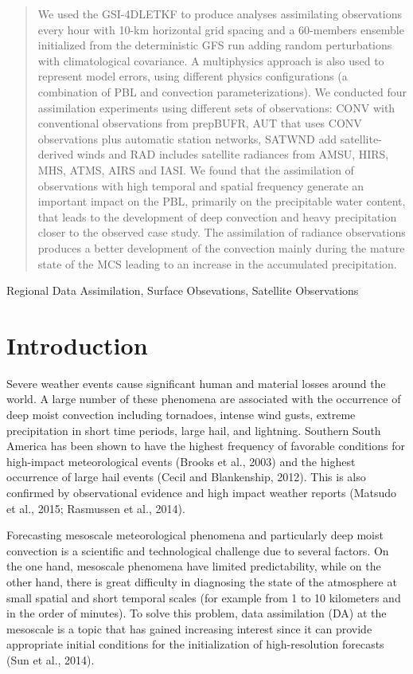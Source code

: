 \documentclass[final,5p,times,twocolumn,authoryear]{elsarticle} %
\begin{document}
\begin{frontmatter}
\begin{abstract}
  We used the GSI-4DLETKF to produce analyses assimilating observations every hour with 10-km horizontal grid spacing and a 60-members ensemble initialized from the deterministic GFS run adding random perturbations with climatological covariance. A multiphysics approach is also used to represent model errors, using different physics configurations (a combination of PBL and convection parameterizations). We conducted four assimilation experiments using different sets of observations: CONV with conventional observations from prepBUFR, AUT that uses CONV observations plus automatic station networks, SATWND add satellite-derived winds and RAD includes satellite radiances from AMSU, HIRS, MHS, ATMS, AIRS and IASI. We found that the assimilation of observations with high temporal and spatial frequency generate an important impact on the PBL, primarily on the precipitable water content, that leads to the development of deep convection and heavy precipitation closer to the observed case study. The assimilation of radiance observations produces a better development of the convection mainly during the mature state of the MCS leading to an increase in the accumulated precipitation.
  \end{abstract}
   \begin{keyword} Regional Data Assimilation, Surface Obsevations, Satellite Observations\end{keyword}
 \end{frontmatter}

\hypertarget{introduction}{%
\section{Introduction}\label{introduction}}

Severe weather events cause significant human and material losses around the world. A large number of these phenomena are associated with the occurrence of deep moist convection including tornadoes, intense wind gusts, extreme precipitation in short time periods, large hail, and lightning.
Southern South America has been shown to have the highest frequency of favorable conditions for high-impact meteorological events (Brooks et al., 2003) and the highest occurrence of large hail events (Cecil and Blankenship, 2012).
This is also confirmed by observational evidence and high impact weather reports (Matsudo et al., 2015; Rasmussen et al., 2014).

Forecasting mesoscale meteorological phenomena and particularly deep moist convection is a scientific and technological challenge due to several factors.
On the one hand, mesoscale phenomena have limited predictability, while on the other hand, there is great difficulty in diagnosing the state of the atmosphere at small spatial and short temporal scales (for example from 1 to 10 kilometers and in the order of minutes).
To solve this problem, data assimilation (DA) at the mesoscale is a topic that has gained increasing interest since it can provide appropriate initial conditions for the initialization of high-resolution forecasts (Sun et al., 2014).
\end{document}
